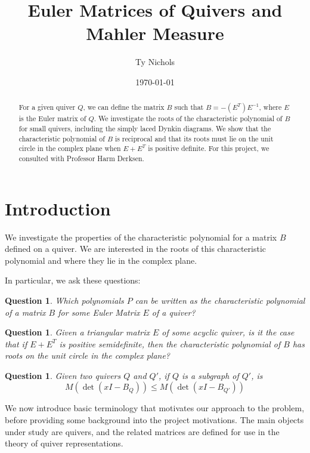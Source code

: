 \documentclass{amsart}
\theoremstyle{theorem}
\theoremstyle{theorem*}
\newtheorem{question}[theorem]{Question}
\theoremstyle{definition}
\begin{document}
\date{\today}
\title[Euler Matrices and Mahler Measure] {Euler Matrices of Quivers and Mahler Measure}
\author[T. Nichols]{Ty Nichols}
\address{Department of Mathematics, Northeastern University, Boston,
    Massachusetts~02115}
\begin{abstract} For a given quiver $Q$, we can define the matrix $B$ such that
    $B = -(E^T)E^{-1}$, where $E$ is the Euler matrix of $Q$. We investigate
    the roots of the characteristic polynomial of $B$ for
    small quivers, including the simply laced Dynkin diagrams. We show that
    the characteristic polynomial of $B$ is reciprocal and that its roots must
    lie on the unit circle in the complex plane when $E + E^T$ is positive definite.
    For this project, we consulted with Professor Harm Derksen.
\end{abstract}
\maketitle

\section{Introduction}

We investigate the properties of the characteristic polynomial for a matrix $B$ defined
on a quiver. We are interested in the roots of this characteristic polynomial
and where they lie in the complex plane.

In particular, we ask these questions:

\begin{question}
    Which polynomials $P$ can be written as the characteristic polynomial of a
    matrix $B$ for some Euler Matrix $E$ of a quiver?
\end{question}

\begin{question}
    Given a triangular matrix $E$ of some acyclic quiver,
    is it the case that if $E + E^T$ is positive semidefinite,
    then the characteristic polynomial of $B$ has roots on the unit circle
    in the complex plane?
\end{question}

\begin{question}
    Given two quivers $Q$ and $Q'$, if $Q$ is a subgraph of $Q'$, is
    $$M(\det(xI - B_Q)) \leq
        M(\det(xI - B_{Q'}))$$
\end{question}

We now introduce basic terminology that motivates our approach to the
problem, before providing some background into the project motivations.
The main objects under study are quivers, and the related matrices are
defined for use in the theory of quiver representations.
\end{document}
